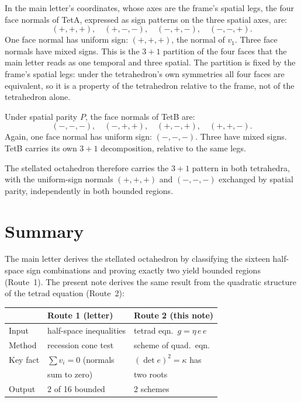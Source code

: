 \documentclass[twocolumn]{iopjournal}
\begin{document}
In the main letter's coordinates, whose axes are the frame's spatial legs, the four face normals of TetA, expressed as sign patterns on the three spatial axes, are:
\begin{equation}
(+,+,+), \quad (+,-,-), \quad (-,+,-), \quad (-,-,+).
\end{equation}
One face normal has uniform sign: $(+,+,+)$, the normal of $v_1$. Three face normals have mixed signs. This is the $3+1$ partition of the four faces that the main letter reads as one temporal and three spatial. The partition is fixed by the frame's spatial legs: under the tetrahedron's own symmetries all four faces are equivalent, so it is a property of the tetrahedron relative to the frame, not of the tetrahedron alone.

Under spatial parity $P$, the face normals of TetB are:
\begin{equation}
(-,-,-), \quad (-,+,+), \quad (+,-,+), \quad (+,+,-).
\end{equation}
Again, one face normal has uniform sign: $(-,-,-)$. Three have mixed signs. TetB carries its own $3+1$ decomposition, relative to the same legs.

The stellated octahedron therefore carries the $3+1$ pattern in both tetrahedra, with the uniform-sign normals $(+,+,+)$ and $(-,-,-)$ exchanged by spatial parity, independently in both bounded regions.


\section*{Summary}

The main letter derives the stellated octahedron by classifying the sixteen half-space sign combinations and proving exactly two yield bounded regions (Route~1). The present note derives the same result from the quadratic structure of the tetrad equation (Route~2):

\vspace{6pt}
\noindent
{\footnotesize\setlength{\tabcolsep}{4pt}%
\begin{tabular*}{\columnwidth}{@{\extracolsep{\fill}}lll@{}}
\hline
 & Route 1 (letter) & Route 2 (this note) \\
\hline
Input & half-space inequalities & tetrad eqn.\ $g = \eta\, e\, e$ \\
Method & recession cone test & scheme of quad.\ eqn. \\
Key fact & $\sum v_i = 0$ (normals & $(\det e)^2 = \kappa$ has \\
 & sum to zero) & two roots \\
Output & 2 of 16 bounded & 2 schemes \\
\hline
\end{tabular*}}
\vspace{6pt}
\end{document}
